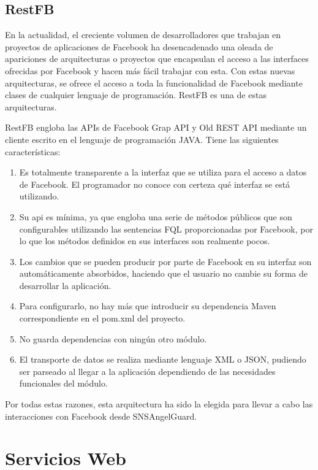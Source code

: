 \subsection{RestFB}
En la actualidad, el creciente volumen de desarrolladores que trabajan en proyectos de aplicaciones de Facebook ha desencadenado una oleada de apariciones de arquitecturas o proyectos que encapsulan el acceso a las interfaces ofrecidas por Facebook y hacen más fácil trabajar con esta. Con estas nuevas arquitecturas, se ofrece el acceso a toda la funcionalidad de Facebook mediante clases de cualquier lenguaje de programación. RestFB es una de estas arquitecturas.
\bigskip
\par
RestFB engloba las APIs de Facebook Grap API y Old REST API mediante un cliente escrito en el lenguaje de programación JAVA. Tiene las siguientes características:
\begin{enumerate}
\item Es totalmente transparente a la interfaz que se utiliza para el acceso a datos de Facebook. El programador no conoce con certeza qué interfaz se está utilizando.
\item Su api es mínima, ya que engloba una serie de métodos públicos que son configurables utilizando las sentencias FQL proporcionadas por Facebook, por lo que los métodos definidos en sus interfaces son realmente pocos.
\item Los cambios que se pueden producir por parte de Facebook en su interfaz son automáticamente absorbidos, haciendo que el usuario no cambie su forma de
desarrollar la aplicación.
\item Para configurarlo, no hay más que introducir su dependencia Maven correspondiente en el pom.xml del proyecto.
\item No guarda dependencias con ningún otro módulo.
\item El transporte de datos se realiza mediante lenguaje XML o JSON, pudiendo ser parseado al llegar a la aplicación dependiendo de las necesidades funcionales del módulo.
\end{enumerate} 
Por todas estas razones, esta arquitectura ha sido la elegida para llevar a cabo las interacciones con Facebook desde SNSAngelGuard.

\section{Servicios Web}

